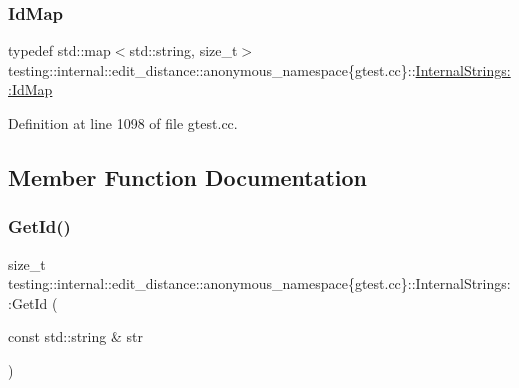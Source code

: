 \subsubsection{\texorpdfstring{Id\+Map}{IdMap}}
{\footnotesize\ttfamily typedef std\+::map$<$std\+::string, size\+\_\+t$>$ testing\+::internal\+::edit\+\_\+distance\+::anonymous\+\_\+namespace\{gtest.\+cc\}\+::\hyperlink{classtesting_1_1internal_1_1edit__distance_1_1anonymous__namespace_02gtest_8cc_03_1_1InternalStrings_a8c510fbc110525be4b4f9568da60d354}{Internal\+Strings\+::\+Id\+Map}\hspace{0.3cm}{\ttfamily [private]}}



Definition at line 1098 of file gtest.\+cc.



\subsection{Member Function Documentation}
\mbox{\label{classtesting_1_1internal_1_1edit__distance_1_1anonymous__namespace_02gtest_8cc_03_1_1InternalStrings_a19e907f1050d89f17c6eabb1a04a25bc}} 
\subsubsection{\texorpdfstring{Get\+Id()}{GetId()}}
{\footnotesize\ttfamily size\+\_\+t testing\+::internal\+::edit\+\_\+distance\+::anonymous\+\_\+namespace\{gtest.\+cc\}\+::Internal\+Strings\+::\+Get\+Id (\begin{DoxyParamCaption}\item[{const std\+::string \&}]{str }\end{DoxyParamCaption})\hspace{0.3cm}{\ttfamily [inline]}}



